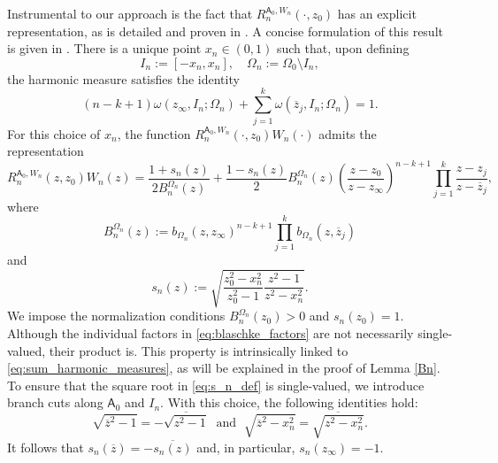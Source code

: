 \documentclass[12pt,oneside,reqno]{amsart}
\theoremstyle{definition}
\numberwithin{equation}{section}
\newcommand{\sfA}{\mathsf{A}}
\begin{document}
Instrumental to our approach is the fact that $R_{n}^{\sfA_0,W_n}(\cdot, z_0)$ has an explicit representation, as is detailed and proven in \cite{yuditskii99}. A concise formulation of this result is given in \cite[Theorem 2.2]{eichinger17}. There is a unique point $x_n\in (0,1)$ such that, upon defining 
\begin{equation}
\label{I_n}
   I_n := [-x_n,x_n], \quad \Omega_n := \Omega_0\setminus I_n, 
\end{equation}   
the harmonic measure satisfies the identity
\begin{equation}
	(n-k+1)\omega(z_\infty,I_n;\Omega_n)+\sum_{j=1}^{k}\omega(\overline{z}_j,I_n;\Omega_n) = 1.
	\label{eq:sum_harmonic_measures}
\end{equation} 
For this choice of \(x_n\), the function $R_n^{\sfA_0,W_n}(\cdot, z_0)W_n(\cdot)$ admits the representation
\begin{equation} 
	R_n^{\sfA_0,W_n}(z,z_0)W_n(z)=
	\frac{1+s_n(z)}{2B_n^{\Omega_n}(z)}+
	\frac{1-s_n(z)}{2}
	B_n^{\Omega_n}(z) \left(\frac{z-z_0}{z-z_\infty}\right)^{n-k+1} 
	\prod_{j=1}^{k}\frac{z-z_j}{z-\overline{z}_j},
	\label{eq:extremal_solution}
\end{equation}
where
\begin{equation}
	B_n^{\Omega_n}(z) := b_{\Omega_n}(z,z_\infty)^{n-k+1}\prod_{j=1}^{k}b_{\Omega_n}(z,\overline{z} _j)
	\label{eq:blaschke_factors}
\end{equation}
and
\begin{equation}
	s_n(z) := \sqrt{\frac{z_0^2-x_n^2}{z_0^2-1}\frac{z^2-1}{z^2-x_n^2}}.
	\label{eq:s_n_def}
\end{equation}
We impose the normalization conditions $B_{n}^{\Omega_n}(z_0)>0$ and $s_n(z_0) = 1$. 
Although the individual factors in \eqref{eq:blaschke_factors} are not necessarily single-valued, their product is. This property is intrinsically linked to \eqref{eq:sum_harmonic_measures}, as will be explained in the proof of Lemma \ref{Bn}.
To ensure that the square root in \eqref{eq:s_n_def} is single-valued, we introduce branch cuts along $\sfA_0$ and $I_n$. With this choice, the following identities hold:
\[
   \sqrt{\overline{z}^2-1}=-\overline{\sqrt{z^2-1}}
   \; \mbox{ and } \;
   \sqrt{\overline{z}^2-x^2_n}=\overline{\sqrt{z^2-x_n^2}}.
\]
It follows that $s_n(\overline{z})=-\overline{s_n(z)}$ and, in particular, $s_n(z_\infty)=-1$.
\end{document}
